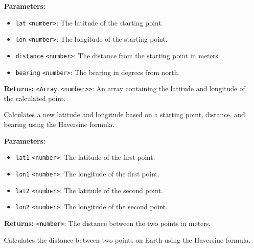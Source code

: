\documentclass[12pt,a4paper]{article}
\begin{document}
\vspace{5mm}
\noindent {}


\noindent \textbf{Parameters:}
\begin{itemize}
  \item \texttt{lat} \texttt{<number>}: The latitude of the starting point.
  \item \texttt{lon} \texttt{<number>}: The longitude of the starting point.
  \item \texttt{distance} \texttt{<number>}: The distance from the starting point in meters.
  \item \texttt{bearing} \texttt{<number>}: The bearing in degrees from north.
\end{itemize}

\noindent \textbf{Returns:} \texttt{<Array.<number>>}: An array containing the latitude and longitude of the calculated point.

\noindent Calculates a new latitude and longitude based on a starting point, distance, and bearing using the Haversine formula.

\vspace{5mm}
\noindent {}


\noindent \textbf{Parameters:}
\begin{itemize}
  \item \texttt{lat1} \texttt{<number>}: The latitude of the first point.
  \item \texttt{lon1} \texttt{<number>}: The longitude of the first point.
  \item \texttt{lat2} \texttt{<number>}: The latitude of the second point.
  \item \texttt{lon2} \texttt{<number>}: The longitude of the second point.
\end{itemize}

\noindent \textbf{Returns:} \texttt{<number>}: The distance between the two points in meters.

\noindent Calculates the distance between two points on Earth using the Haversine formula.

\vspace{5mm}
\noindent {}
\end{document}
